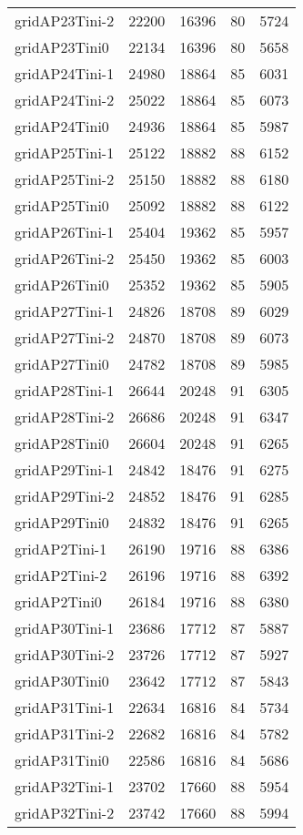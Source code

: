 \begin{tabular}{lrrrr}
gridAP23Tini-2 & 22200 & 16396 & 80 & 5724 \\
gridAP23Tini0 & 22134 & 16396 & 80 & 5658 \\
gridAP24Tini-1 & 24980 & 18864 & 85 & 6031 \\
gridAP24Tini-2 & 25022 & 18864 & 85 & 6073 \\
gridAP24Tini0 & 24936 & 18864 & 85 & 5987 \\
gridAP25Tini-1 & 25122 & 18882 & 88 & 6152 \\
gridAP25Tini-2 & 25150 & 18882 & 88 & 6180 \\
gridAP25Tini0 & 25092 & 18882 & 88 & 6122 \\
gridAP26Tini-1 & 25404 & 19362 & 85 & 5957 \\
gridAP26Tini-2 & 25450 & 19362 & 85 & 6003 \\
gridAP26Tini0 & 25352 & 19362 & 85 & 5905 \\
gridAP27Tini-1 & 24826 & 18708 & 89 & 6029 \\
gridAP27Tini-2 & 24870 & 18708 & 89 & 6073 \\
gridAP27Tini0 & 24782 & 18708 & 89 & 5985 \\
gridAP28Tini-1 & 26644 & 20248 & 91 & 6305 \\
gridAP28Tini-2 & 26686 & 20248 & 91 & 6347 \\
gridAP28Tini0 & 26604 & 20248 & 91 & 6265 \\
gridAP29Tini-1 & 24842 & 18476 & 91 & 6275 \\
gridAP29Tini-2 & 24852 & 18476 & 91 & 6285 \\
gridAP29Tini0 & 24832 & 18476 & 91 & 6265 \\
gridAP2Tini-1 & 26190 & 19716 & 88 & 6386 \\
gridAP2Tini-2 & 26196 & 19716 & 88 & 6392 \\
gridAP2Tini0 & 26184 & 19716 & 88 & 6380 \\
gridAP30Tini-1 & 23686 & 17712 & 87 & 5887 \\
gridAP30Tini-2 & 23726 & 17712 & 87 & 5927 \\
gridAP30Tini0 & 23642 & 17712 & 87 & 5843 \\
gridAP31Tini-1 & 22634 & 16816 & 84 & 5734 \\
gridAP31Tini-2 & 22682 & 16816 & 84 & 5782 \\
gridAP31Tini0 & 22586 & 16816 & 84 & 5686 \\
gridAP32Tini-1 & 23702 & 17660 & 88 & 5954 \\
gridAP32Tini-2 & 23742 & 17660 & 88 & 5994 \\

\end{tabular}
